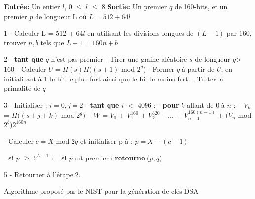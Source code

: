 \documentclass[a4paper,11pt]{article}
\renewcommand{\algorithmicreturn}{\textbf{retourne}}
\renewcommand{\algorithmicrequire}{\textbf{Entrée:}}
\renewcommand{\algorithmicensure}{\textbf{Sortie:}}
\renewcommand{\algorithmicif}{\textbf{si}}
\renewcommand{\algorithmicfor}{\textbf{pour}}
\renewcommand{\algorithmicwhile}{\textbf{tant que}}
\begin{document}
\begin{algorithm}[H]
\SetAlgoLined
\newline
\newline
\algorithmicrequire{ Un entier $l$, 0 $\le$ $l$ $\le$ 8}\newline
\algorithmicensure{ Un premier $q$ de 160-bits, et un premier $p$ de longueur L où $L = 512 + 64l$}\newline

 1 - Calculer L = 512 + 64$l$ en utilisant les divisions longues de $(L-1)$ par 160, trouver $n,b$ tels que $L-1 = 160n + b$\newline

 2 - \algorithmicwhile{ $q$ n'est pas premier } \newline
 \hspace*{10mm} - Tirer une graine aléatoire $s$ de longueur $g$> $160$ \newline
 \hspace*{10mm} - Calculer $U = H(s) $\oplus$ H((s+1)$ mod $2^{g})$      \newline
 \hspace*{10mm} - Former $q$ à partir de $U$, en initialisant à 1 le bit le plus fort ainsi 
 \newline \hspace*{10mm} que le bit le moins fort.  \newline
 \hspace*{10mm} - Tester la primalité de $q$

 
 3 - Initialiser : $i=0, j=2$  - \algorithmicwhile{ $i$ $<$ 4096 :}
 \newline \hspace*{10mm}
    - \algorithmicfor { $k$ allant de $0$ à $n$} :
\newline \hspace*{20mm} -- $V_{k}$ = $H((s+j+k)$ mod 
$2^{g})$
\newline \hspace*{20mm} -- $W$ = $V_{0}$ + $V_{1}^{160}$ + $V_{2}^{320}$ $+ ... +$  $V_{n-1}^{160(n-1)}$ + $(V_{n}$ mod $2^{b}$)$2^{160n}$

\newline \hspace*{10mm} - Calculer $c = X $ mod $2q$ et initialiser p à : $p = X- (c-1)$

\newline \hspace*{10mm} - \algorithmicif { $p$ $\geq$ 
$2^{L-1}$ :} 
\newline \hspace*{20mm} -- \algorithmicif { $p$ est premier :}
\newline \hspace*{30mm}  \algorithmicreturn{ ($p,q$) }

 5 - Retourner à l'étape 2.
 \newline
 
 \caption{Algorithme proposé par le NIST pour la génération de clés DSA}
\end{algorithm}
\end{document}
